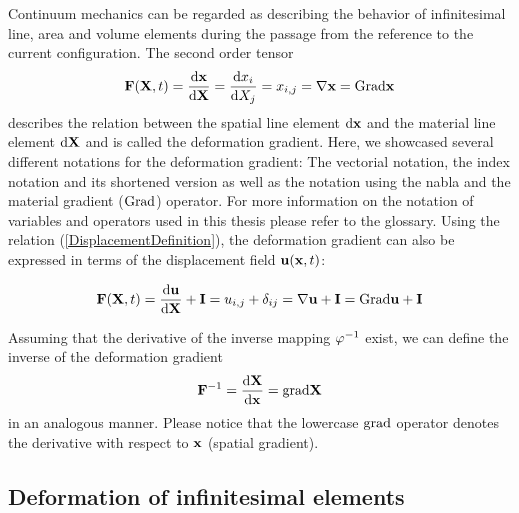 Continuum mechanics can be regarded as describing the behavior of infinitesimal line, area and volume elements during the passage from the reference to the current configuration. The second order tensor  
\begin{equation}
\mathbf {F }(\mathbf {X} ,t) = \frac{\textnormal{d} \mathbf {x }}{\textnormal{d} \mathbf {X }} = \frac{\textnormal{d} {x }_i}{\textnormal{d} {X }_j}  = x_{i,j} = \nabla \mathbf {x}  =  \textnormal{Grad} \mathbf {x} 
\label{DeformationGradient}
\end{equation}
describes the relation between the spatial line element $\textnormal{d} \mathbf {x }$ and the material line element $\textnormal{d} \mathbf {X }$ and is called the deformation gradient. Here, we showcased several different notations for the deformation gradient: The vectorial notation, the index notation and its shortened version as well as the notation using the nabla and the material gradient ($ \textnormal{Grad}$) operator. For more information on the notation of variables and operators used in this thesis please refer to the glossary. Using the relation (\ref{DisplacementDefinition}), the deformation gradient can also be expressed in terms of the displacement field $\mathbf {u}  (\mathbf {x} , t)$:

\begin{equation}
\mathbf {F }(\mathbf {X} ,t) = \frac{\textnormal{d} \mathbf {u }}{\textnormal{d} \mathbf {X }} +  \mathbf {I } = u_{i,j} + \delta _{ij} = \nabla \mathbf {u}  +  \mathbf {I } =  \textnormal{Grad} \mathbf {u}  +  \mathbf {I } 
\label{DeformationGradientDisplacement}
\end{equation}

Assuming that the derivative of the inverse mapping $\varphi^{-1}$ exist, we can define the inverse of the deformation gradient 
\begin{equation}
\mathbf {F }^{-1} = \frac{\textnormal{d} \mathbf {X }}{\textnormal{d} \mathbf {x }} =  \textnormal{grad} \mathbf {X} 
\label{InverseDeformationGradient}
\end{equation}
in an analogous manner. Please notice that the lowercase $ \textnormal{grad}$ operator denotes the derivative with respect to $\mathbf {x} $ (spatial gradient).

\subsection{Deformation of infinitesimal elements}
\label{DeformationOfInfinitesimalElements}

